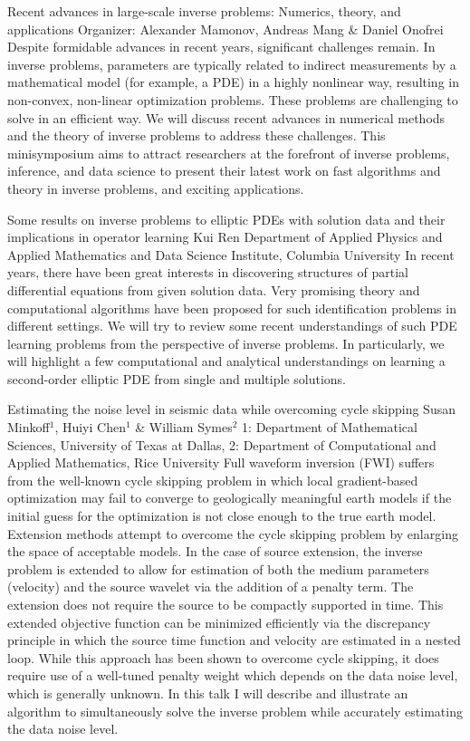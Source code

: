 \label{mini01}

\miniabs
{Recent advances in large-scale inverse problems: Numerics, theory, and applications}
{Organizer: Alexander Mamonov, Andreas Mang \& Daniel Onofrei}
{Despite formidable advances in recent years, significant challenges remain. In inverse problems, parameters are typically related to indirect measurements by a mathematical model (for example, a PDE) in a highly nonlinear way, resulting in non-convex, non-linear optimization problems. These problems are challenging to solve in an efficient way. We will discuss recent advances in numerical methods and the theory of inverse problems to address these challenges. This minisymposium aims to attract researchers at the forefront of inverse problems, inference, and data science to present their latest work on fast algorithms and theory in inverse problems, and exciting applications.}

\vspace{2ex}
\abs
{Some results on inverse problems to elliptic {PDE}s with solution data and their implications in operator learning}
{Kui Ren}
{Department of Applied Physics and Applied Mathematics and Data Science Institute, Columbia University}
{In recent years, there have been great interests in discovering structures of partial differential equations from given solution data. Very promising theory and computational algorithms have been proposed for such identification problems in different settings. We will try to review some recent understandings of such PDE learning problems from the perspective of inverse problems. In particularly, we will highlight a few computational and analytical understandings on learning a second-order elliptic PDE from single and multiple solutions.}


\vspace{1.5ex}
\abs
{Estimating the noise level in seismic data while overcoming cycle skipping}
{Susan Minkoff$^{1}$, Huiyi Chen$^{1}$ \& William Symes$^{2}$}
{1: Department of Mathematical Sciences, University of Texas at Dallas, 2:  Department of Computational and Applied Mathematics, Rice University}
{Full waveform inversion (FWI) suffers from the well-known cycle skipping problem in which local gradient-based optimization may fail to converge to geologically meaningful earth models if the initial guess for the optimization is not close enough to the true earth model. Extension methods attempt to overcome the cycle skipping problem by enlarging the space of acceptable models. In the case of source extension, the inverse problem is extended to allow for estimation of both the medium parameters (velocity) and the source wavelet via the addition of a penalty term. The extension does not require the source to be compactly supported in time. This extended objective function can be minimized efficiently  via the discrepancy principle in which the source time function and velocity are estimated in a nested loop. While this approach has been shown to overcome cycle skipping, it does require use of a well-tuned penalty weight which depends on the data noise level, which is generally unknown. In this talk I will describe and illustrate an algorithm to simultaneously solve the inverse problem while accurately estimating the data noise level.}


